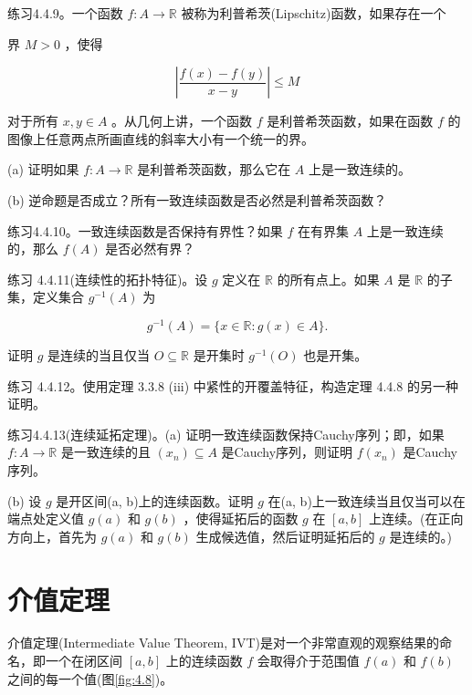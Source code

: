 练习4.4.9。一个函数 \(f : A \rightarrow  \mathbb{R}\) 被称为利普希茨(Lipschitz)函数，如果存在一个

界 \(M > 0\) ，使得

\[
\left| \frac{f\left( x\right)  - f\left( y\right) }{x - y}\right|  \leq  M
\]

对于所有 \(x,y \in  A\) 。从几何上讲，一个函数 \(f\) 是利普希茨函数，如果在函数 \(f\) 的图像上任意两点所画直线的斜率大小有一个统一的界。

(a) 证明如果 \(f : A \rightarrow  \mathbb{R}\) 是利普希茨函数，那么它在 \(A\) 上是一致连续的。

(b) 逆命题是否成立？所有一致连续函数是否必然是利普希茨函数？

练习4.4.10。一致连续函数是否保持有界性？如果 \(f\) 在有界集 \(A\) 上是一致连续的，那么 \(f\left( A\right)\) 是否必然有界？

练习 4.4.11(连续性的拓扑特征)。设 \(g\) 定义在 \(\mathbb{R}\) 的所有点上。如果 \(A\) 是 \(\mathbb{R}\) 的子集，定义集合 \({g}^{-1}\left( A\right)\) 为

\[
{g}^{-1}\left( A\right)  = \{ x \in  \mathbb{R} : g\left( x\right)  \in  A\} .
\]

证明 \(g\) 是连续的当且仅当 \(O \subseteq  \mathbb{R}\) 是开集时 \({g}^{-1}\left( O\right)\) 也是开集。

练习 4.4.12。使用定理 3.3.8 (iii) 中紧性的开覆盖特征，构造定理 4.4.8 的另一种证明。

练习4.4.13(连续延拓定理)。(a) 证明一致连续函数保持Cauchy序列；即，如果 \(f : A \rightarrow  \mathbb{R}\) 是一致连续的且 \(\left( {x}_{n}\right)  \subseteq  A\) 是Cauchy序列，则证明 \(f\left( {x}_{n}\right)\) 是Cauchy序列。

(b) 设 \(g\) 是开区间(a, b)上的连续函数。证明 \(g\) 在(a, b)上一致连续当且仅当可以在端点处定义值 \(g\left( a\right)\) 和 \(g\left( b\right)\) ，使得延拓后的函数 \(g\) 在 \(\left\lbrack  {a,b}\right\rbrack\) 上连续。(在正向方向上，首先为 \(g\left( a\right)\) 和 \(g\left( b\right)\) 生成候选值，然后证明延拓后的 \(g\) 是连续的。)

\section{介值定理}
\label{sec:4.5}
介值定理(Intermediate Value Theorem, IVT)是对一个非常直观的观察结果的命名，即一个在闭区间 \(\left\lbrack  {a,b}\right\rbrack\) 上的连续函数 \(f\) 会取得介于范围值 \(f\left( a\right)\) 和 \(f\left( b\right)\) 之间的每一个值(图\ref{fig:4.8})。

